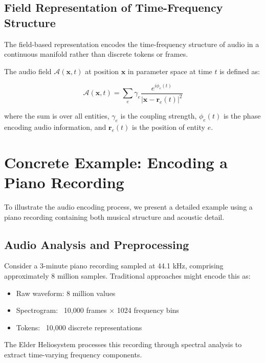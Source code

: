 \subsection{Field Representation of Time-Frequency Structure}

The field-based representation encodes the time-frequency structure of audio in a continuous manifold rather than discrete tokens or frames.

\begin{definition}
The audio field $\mathcal{A}(\mathbf{x}, t)$ at position $\mathbf{x}$ in parameter space at time $t$ is defined as:

\begin{equation}
\mathcal{A}(\mathbf{x}, t) = \sum_{e} \gamma_e \frac{e^{i\phi_e(t)}}{|\mathbf{x} - \mathbf{r}_e(t)|^2}
\end{equation}

where the sum is over all entities, $\gamma_e$ is the coupling strength, $\phi_e(t)$ is the phase encoding audio information, and $\mathbf{r}_e(t)$ is the position of entity $e$.
\end{definition}

\section{Concrete Example: Encoding a Piano Recording}

To illustrate the audio encoding process, we present a detailed example using a piano recording containing both musical structure and acoustic detail.

\subsection{Audio Analysis and Preprocessing}

Consider a 3-minute piano recording sampled at 44.1 kHz, comprising approximately 8 million samples. Traditional approaches might encode this as:
\begin{itemize}
    \item Raw waveform: 8 million values
    \item Spectrogram: ~10,000 frames × 1024 frequency bins
    \item Tokens: ~10,000 discrete representations
\end{itemize}

The Elder Heliosystem processes this recording through spectral analysis to extract time-varying frequency components.

